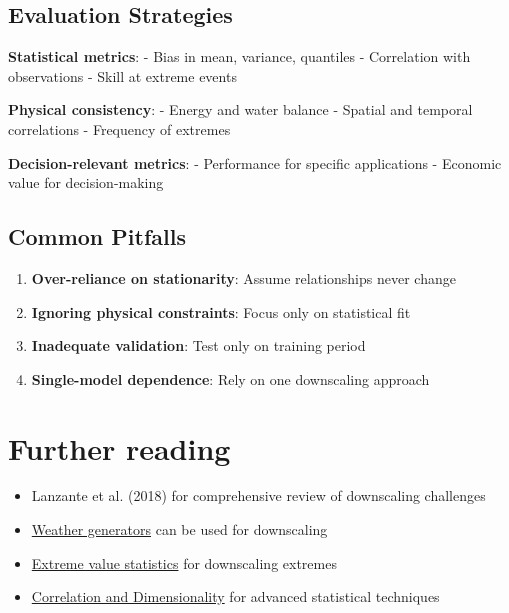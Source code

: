 \documentclass[
  letterpaper,
  DIV=11,
  numbers=noendperiod]{scrreprt}
\providecommand{\tightlist}{%
  \setlength{\itemsep}{0pt}\setlength{\parskip}{0pt}}
\begin{document}
\subsection{Evaluation Strategies}\label{evaluation-strategies}

\textbf{Statistical metrics}: - Bias in mean, variance, quantiles -
Correlation with observations - Skill at extreme events

\textbf{Physical consistency}: - Energy and water balance - Spatial and
temporal correlations - Frequency of extremes

\textbf{Decision-relevant metrics}: - Performance for specific
applications - Economic value for decision-making

\subsection{Common Pitfalls}\label{common-pitfalls}

\begin{enumerate}
\def\labelenumi{\arabic{enumi}.}
\tightlist
\item
  \textbf{Over-reliance on stationarity}: Assume relationships never
  change
\item
  \textbf{Ignoring physical constraints}: Focus only on statistical fit
\item
  \textbf{Inadequate validation}: Test only on training period
\item
  \textbf{Single-model dependence}: Rely on one downscaling approach
\end{enumerate}

\section*{Further reading}\label{further-reading-8}


\begin{itemize}
\tightlist
\item
  Lanzante et al. (2018) for comprehensive review of downscaling
  challenges
\item
  \href{./generators.qmd}{Weather generators} can be used for
  downscaling
\item
  \hyperref[extreme-value-theory]{Extreme value statistics} for
  downscaling extremes
\item
  \href{./chapters/fundamentals/correlation-dimensionality.qmd}{Correlation
  and Dimensionality} for advanced statistical techniques
\end{itemize}
\end{document}
